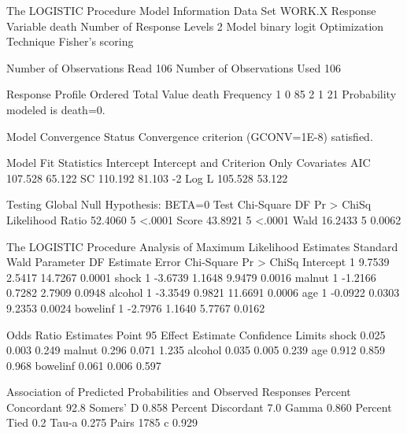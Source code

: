 \documentclass{article}
\begin{document}
\begin{Woutput}
The LOGISTIC Procedure
              Model Information
Data Set                      WORK.X
Response Variable             death
Number of Response Levels     2
Model                         binary logit
Optimization Technique        Fisher's scoring

Number of Observations Read         106
Number of Observations Used         106

          Response Profile
 Ordered                      Total
   Value        death     Frequency
       1            0            85
       2            1            21
Probability modeled is death=0.

                    Model Convergence Status
         Convergence criterion (GCONV=1E-8) satisfied.

         Model Fit Statistics
                             Intercept
              Intercept            and
Criterion          Only     Covariates
AIC             107.528         65.122
SC              110.192         81.103
-2 Log L        105.528         53.122

        Testing Global Null Hypothesis: BETA=0
Test                 Chi-Square       DF     Pr > ChiSq
Likelihood Ratio        52.4060        5         <.0001
Score                   43.8921        5         <.0001
Wald                    16.2433        5         0.0062

The LOGISTIC Procedure
             Analysis of Maximum Likelihood Estimates
                               Standard          Wald
Parameter    DF    Estimate       Error    Chi-Square    Pr > ChiSq
Intercept     1      9.7539      2.5417       14.7267        0.0001
shock         1     -3.6739      1.1648        9.9479        0.0016
malnut        1     -1.2166      0.7282        2.7909        0.0948
alcohol       1     -3.3549      0.9821       11.6691        0.0006
age           1     -0.0922      0.0303        9.2353        0.0024
bowelinf      1     -2.7976      1.1640        5.7767        0.0162

            Odds Ratio Estimates
               Point          95%
Effect      Estimate      Confidence Limits
shock          0.025       0.003       0.249
malnut         0.296       0.071       1.235
alcohol        0.035       0.005       0.239
age            0.912       0.859       0.968
bowelinf       0.061       0.006       0.597

Association of Predicted Probabilities and Observed Responses
Percent Concordant     92.8    Somers' D    0.858
Percent Discordant      7.0    Gamma        0.860
Percent Tied            0.2    Tau-a        0.275
Pairs                  1785    c            0.929


\end{Woutput}
\end{document}
